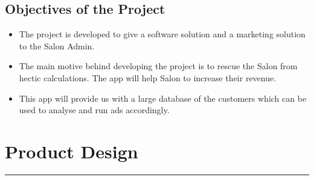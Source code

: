 \section{Objectives of the Project }
\begin{itemize}
	\item The project is developed to give a software solution and a marketing solution to the Salon Admin.
	\item The main motive behind developing the project is to rescue the Salon from hectic calculations. The app will help Salon to increase their revenue.
	\item This app will provide us with a large database of the customers which can be used to analyse and run ads accordingly.
\end{itemize}


\chapter{Product Design}\hrule
\label{Chapter:3}

